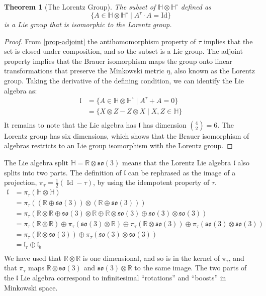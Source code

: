 \documentclass{amsart}
\newcommand{\HH}{\mathbb{H}}
\newcommand{\RR}{\mathbb{R}}
\newcommand{\so}{\mathfrak{so}}
\newcommand{\lorentz}{\mathfrak{l}}
\newcommand{\Id}{\operatorname{Id}}
\newtheorem{theorem}{Theorem}
\begin{document}
\begin{theorem}[The Lorentz Group]
  The subset of $ \HH\otimes \HH^\circ$ defined as
  $$ \{ A \in \HH\otimes\HH^\circ \mid A^\tau \cdot A = \mathrm{Id} \} $$
  is a Lie group that is isomorphic to the Lorentz group.
\end{theorem}

\begin{proof}
From \ref{prop-adjoint} the antihomomorphism property of $\tau$ implies that the set is closed under composition, and so the subset is a Lie group.
The adjoint property implies that the Brauer isomorphism maps the group onto linear transformations that preserve the Minkowski metric $\eta$, also known as the Lorentz group.
Taking the derivative of the defining condition, we can identify the Lie algebra as:
  \begin{align*}
    \lorentz &= \{ A \in \HH\otimes\HH^\circ \mid A^\tau + A = 0 \} \\
     &= \{ X \otimes Z - Z\otimes X \mid X, Z \in \HH \} \\
  \end{align*}
  It remains to note that the Lie algebra has $\lorentz$ has dimension ${4 \choose 2} = 6$.
  The Lorentz group has six dimensions, which shows that the Brauer isomorphism of algebras restricts to an Lie group isomorphism with the Lorentz group.

\end{proof}

The Lie algebra split $\HH=\RR\otimes\so(3)$ means that the Lorentz Lie algebra $\lorentz$ also splits into two parts.
The definition of $\lorentz$ can be rephrased as the image of a projection, $\pi_\tau = \frac{1}{2}(\Id - \tau )$, by using the idempotent property of $\tau$.
\begin{align*}
  \lorentz &= \pi_\tau(\HH\otimes\HH) \\
  &= \pi_\tau((\RR\oplus\so(3))\otimes(\RR\oplus\so(3))) \\
  &= \pi_\tau(\RR\otimes\RR \oplus \so(3)\otimes\RR \oplus \RR\otimes\so(3) \oplus \so(3)\otimes\so(3)) \\
  &= \pi_\tau(\RR\otimes\RR) \oplus \pi_\tau(\so(3)\otimes\RR) \oplus \pi_\tau(\RR\otimes\so(3)) \oplus \pi_\tau(\so(3)\otimes\so(3)) \\
  &= \pi_\tau(\RR\otimes\so(3)) \oplus \pi_\tau(\so(3)\otimes\so(3)) \\
  &= \lorentz_r \oplus \lorentz_b \\
\end{align*}
We have used that $\RR\otimes\RR$ is one dimensional, and so is in the kernel of $\pi_\tau$, and that $\pi_\tau$ maps $\RR\otimes\so(3)$ and $\so(3)\otimes\RR$ to the same image.
The two parts of the $\lorentz$ Lie algebra correspond to infinitesimal ``rotations'' and ``boosts'' in Minkowski space.
\end{document}
